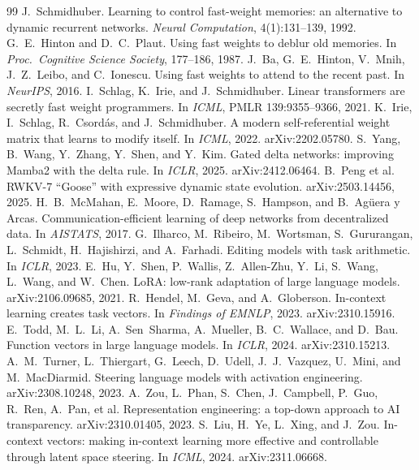 \documentclass[11pt]{article}
\theoremstyle{definition}
\begin{document}
\begin{thebibliography}{99}
 J.~Schmidhuber. Learning to control fast-weight memories: an alternative to dynamic recurrent networks. \emph{Neural Computation}, 4(1):131--139, 1992.
 G.~E.~Hinton and D.~C.~Plaut. Using fast weights to deblur old memories. In \emph{Proc.\ Cognitive Science Society}, 177--186, 1987.
 J.~Ba, G.~E.~Hinton, V.~Mnih, J.~Z.~Leibo, and C.~Ionescu. Using fast weights to attend to the recent past. In \emph{NeurIPS}, 2016.
 I.~Schlag, K.~Irie, and J.~Schmidhuber. Linear transformers are secretly fast weight programmers. In \emph{ICML}, PMLR 139:9355--9366, 2021.
 K.~Irie, I.~Schlag, R.~Csord\'as, and J.~Schmidhuber. A modern self-referential weight matrix that learns to modify itself. In \emph{ICML}, 2022. arXiv:2202.05780.
 S.~Yang, B.~Wang, Y.~Zhang, Y.~Shen, and Y.~Kim. Gated delta networks: improving Mamba2 with the delta rule. In \emph{ICLR}, 2025. arXiv:2412.06464.
 B.~Peng et al. RWKV-7 ``Goose'' with expressive dynamic state evolution. arXiv:2503.14456, 2025.
 H.~B.~McMahan, E.~Moore, D.~Ramage, S.~Hampson, and B.~Ag\"uera y Arcas. Communication-efficient learning of deep networks from decentralized data. In \emph{AISTATS}, 2017.
 G.~Ilharco, M.~Ribeiro, M.~Wortsman, S.~Gururangan, L.~Schmidt, H.~Hajishirzi, and A.~Farhadi. Editing models with task arithmetic. In \emph{ICLR}, 2023.
 E.~Hu, Y.~Shen, P.~Wallis, Z.~Allen-Zhu, Y.~Li, S.~Wang, L.~Wang, and W.~Chen. LoRA: low-rank adaptation of large language models. arXiv:2106.09685, 2021.
 R.~Hendel, M.~Geva, and A.~Globerson. In-context learning creates task vectors. In \emph{Findings of EMNLP}, 2023. arXiv:2310.15916.
 E.~Todd, M.~L.~Li, A.~Sen~Sharma, A.~Mueller, B.~C.~Wallace, and D.~Bau. Function vectors in large language models. In \emph{ICLR}, 2024. arXiv:2310.15213.
 A.~M.~Turner, L.~Thiergart, G.~Leech, D.~Udell, J.~J.~Vazquez, U.~Mini, and M.~MacDiarmid. Steering language models with activation engineering. arXiv:2308.10248, 2023.
 A.~Zou, L.~Phan, S.~Chen, J.~Campbell, P.~Guo, R.~Ren, A.~Pan, et al. Representation engineering: a top-down approach to AI transparency. arXiv:2310.01405, 2023.
 S.~Liu, H.~Ye, L.~Xing, and J.~Zou. In-context vectors: making in-context learning more effective and controllable through latent space steering. In \emph{ICML}, 2024. arXiv:2311.06668.

\end{thebibliography}
\end{document}
